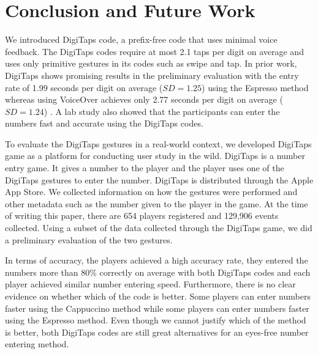 \section{Conclusion and Future Work}
\label{sec:future}
We introduced DigiTaps code, a prefix-free code that uses minimal voice feedback. The DigiTaps codes require at most 2.1 taps per digit on average and uses only primitive gestures in its codes such as swipe and tap. In prior work, DigiTaps shows promising results in the preliminary evaluation with the entry rate of 1.99 seconds per digit on average ($SD = 1.25$) using the Espresso method whereas using VoiceOver achieves only 2.77 seconds per digit on average ($SD = 1.24$) \cite{Ruamviboonsuk:2012}. A lab study also showed that the participants can enter the numbers fast and accurate using the DigiTaps codes.  
\par
To evaluate the DigiTaps gestures in a real-world context, we developed DigiTaps game as a platform for conducting user study in the wild. DigiTaps is a number entry game. It gives a number to the player and the player uses one of the DigiTaps gestures to enter the number. DigiTaps is distributed through the Apple App Store. We collected information on how the gestures were performed and other metadata such as the number given to the player in the game. At the time of writing this paper, there are 654 players registered and 129,906 events collected. Using a subset of the data collected through the DigiTaps game, we did a preliminary evaluation of the two gestures.
\par
In terms of accuracy, the players achieved a high accuracy rate, they entered the numbers more than 80\% correctly on average with both DigiTaps codes and each player achieved similar number entering speed. Furthermore, there is no clear evidence on whether which of the code is better. Some players can enter numbers faster using the Cappuccino method while some players can enter numbers faster using the Espresso method. Even though we cannot justify which of the method is better, both DigiTaps codes are still great alternatives for an eyes-free number entering method.

